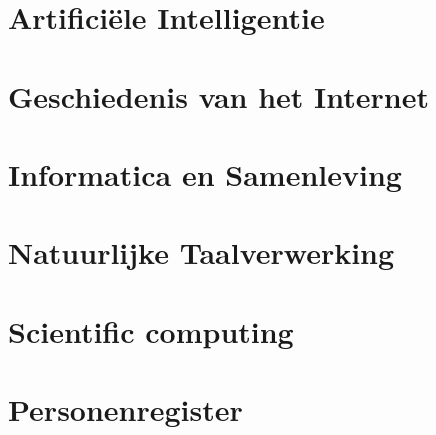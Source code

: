 \documentclass[11pt]{article}
\theoremstyle{definition}
\begin{document}
\section{Artifici\"ele Intelligentie}

\newpage

\section{Geschiedenis van het Internet}

\newpage

\section{Informatica en Samenleving}

\newpage

\section{Natuurlijke Taalverwerking}

\newpage

\section{Scientific computing}

\newpage

\appendix
\section{Personenregister}



%
%
\nocite{*}
\end{document}

